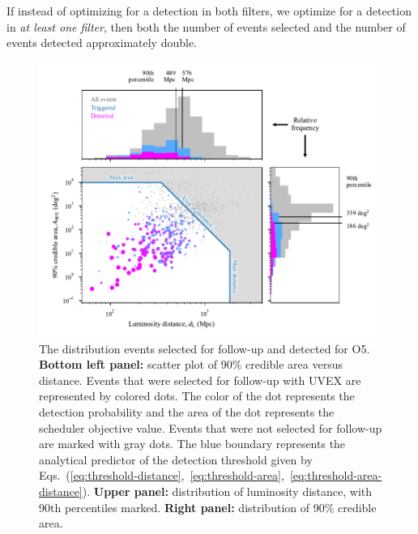 \documentclass[twocolumn,times]{aastex631}
\begin{document}
If instead of optimizing for a detection in both filters, we optimize for a detection in \emph{at least one filter}, then both the number of events selected and the number of events detected approximately double.

\begin{figure}
    \centering
    \includegraphics{figures/area-distance-O5}
    \caption{\label{fig:area-distance-O5}The distribution events selected for follow-up and detected for O5. \textbf{Bottom left panel:} scatter plot of 90\% credible area versus distance. Events that were selected for follow-up with \ac{UVEX} are represented by colored dots. The color of the dot represents the detection probability and the area of the dot represents the scheduler objective value. Events that were not selected for follow-up are marked with gray dots. The blue boundary represents the analytical predictor of the detection threshold given by Eqs.~(\ref{eq:threshold-distance},~\ref{eq:threshold-area},~\ref{eq:threshold-area-distance}). \textbf{Upper panel:} distribution of luminosity distance, with 90th percentiles marked. \textbf{Right panel:} distribution of 90\% credible area.}
\end{figure}
\end{document}
